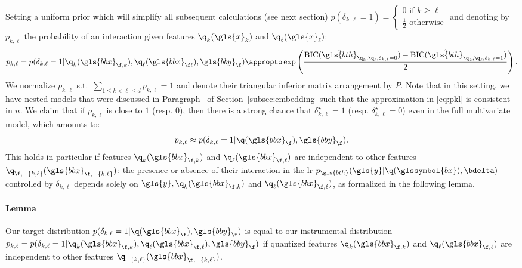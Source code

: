 Setting a uniform prior which will simplify all subsequent calculations (see next section) $p(\delta_{k,\ell}=1) =\begin{cases} 0 \text{ if } k \geq \ell \\ \frac{1}{2} \text{ otherwise} \end{cases}$ and denoting by $p_{k,\ell}$ the probability of an interaction given features $\q_k(\gls{x}_k)$ and $\q_\ell(\gls{x}_\ell)$:
\begin{equation} \label{eq:pkl}
p_{k,\ell} = p(\delta_{k,\ell} = 1 | \q_k(\gls{bbx}_{\f,k}), \q_\ell(\gls{bbx}_{\f\ell}), \gls{bby}_\f) \appropto \exp \left( \frac{\text{BIC}(\hat{\gls{bth}}_{\q_k,\q_\ell,\delta_{k,\ell}=0}) - \text{BIC}(\hat{\gls{bth}}_{\q_k,\q_\ell,\delta_{k,\ell}=1})}{2} \right).
\end{equation}
We normalize $p_{k,\ell}$ s.t.\ $\sum_{1 \leq k < \ell \leq d} p_{k,\ell} = 1$ and denote their triangular inferior matrix arrangement by $P$. Note that in this setting, we have nested models that were discussed in Paragraph~ of Section~\ref{subsec:embedding} such that the approximation in \eqref{eq:pkl} is consistent in $n$.
We claim that if $p_{k,\ell}$ is close to $1$ (resp. $0$), then there is a strong chance that $\delta_{k,\ell}^\star = 1$ (resp. $\delta_{k,\ell}^\star = 0$) even in the full multivariate model, which amounts to:
\[ p_{k,\ell} \approx p(\delta_{k,\ell} = 1 | \q(\gls{bbx}_\f),\gls{bby}_\f) .\]
This holds in particular if features $\q_k(\gls{bbx}_{\f,k})$ and $\q_\ell(\gls{bbx}_{\f,\ell})$ are independent to other features $\q_{\f,-\{k,\ell\}}(\gls{bbx}_{\f,-\{k,\ell\}})$: the presence or absence of their interaction in the \gls{lr} $p_{\gls{bth}}(\gls{y} | \q(\glssymbol{bx}), \bdelta)$ controlled by $\delta_{k,\ell}$ depends solely on $\gls{y}, \q_k(\gls{bbx}_{\f,k})$ and $\q_\ell(\gls{bbx}_{\f,\ell})$, as formalized in the following lemma.

\paragraph{Lemma} Our target distribution $p(\delta_{k,\ell} = 1 | \q(\gls{bbx}_\f),\gls{bby}_\f)$ is equal to our instrumental distribution $p_{k,\ell} = p(\delta_{k,\ell} = 1 | \q_k(\gls{bbx}_{\f,k}), \q_\ell(\gls{bbx}_{\f,\ell}), \gls{bby}_\f)$ if quantized features $\q_k(\gls{bbx}_{\f,k})$ and $\q_\ell(\gls{bbx}_{\f,\ell})$ are independent to other features $\q_{-\{k,\ell\}}(\gls{bbx}_{\f,-\{k,\ell\}})$.

